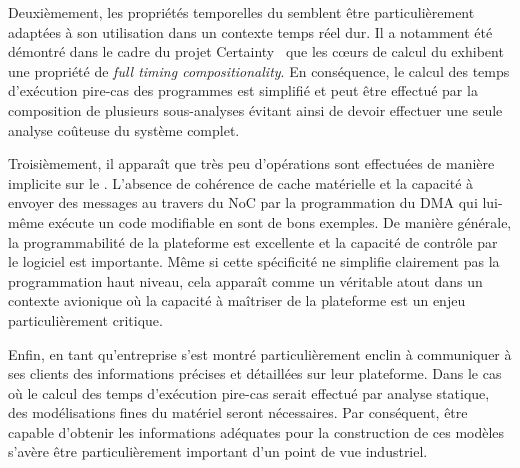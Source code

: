 \documentclass[main.tex]{subfiles}
\begin{document}
Deuxièmement, les propriétés temporelles du \mppalong semblent être particulièrement adaptées à son utilisation dans un contexte temps réel dur. Il a notamment été démontré dans le cadre du projet {\sc Certainty}~\cite{Certainty} que les c\oe{}urs de calcul du \mppalong exhibent une propriété de \emph{full timing compositionality}. En conséquence, le calcul des temps d'exécution pire-cas des programmes est simplifié et peut être effectué par la composition de plusieurs sous-analyses évitant ainsi de devoir effectuer une seule analyse coûteuse du système complet.

Troisièmement, il apparaît que très peu d'opérations sont effectuées de manière implicite sur le \mppalong. L'absence de cohérence de cache matérielle et la capacité à envoyer des messages au travers du NoC par la programmation du DMA qui lui-même exécute un code modifiable en sont de bons exemples. De manière générale, la programmabilité de la plateforme est excellente et la capacité de contrôle par le logiciel est importante. Même si cette spécificité ne simplifie clairement pas la programmation haut niveau, cela apparaît comme un véritable atout dans un contexte avionique où la capacité à maîtriser de la plateforme est un enjeu particulièrement critique.

Enfin, \kalray en tant qu'entreprise s'est montré particulièrement enclin à communiquer à ses clients des informations précises et détaillées sur leur plateforme. Dans le cas où le calcul des temps d'exécution pire-cas serait effectué par analyse statique, des modélisations fines du matériel seront nécessaires. Par conséquent, être capable d'obtenir les informations adéquates pour la construction de ces modèles s'avère être particulièrement important d'un point de vue industriel.

\end{document}
